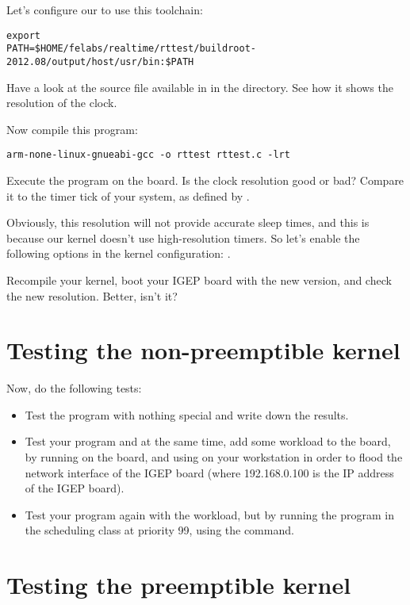Let's configure our  to use this toolchain:

\begin{verbatim}
export
PATH=$HOME/felabs/realtime/rttest/buildroot-2012.08/output/host/usr/bin:$PATH
\end{verbatim}

Have a look at the  source file available in  in
the  directory. See how it shows the resolution of the
 clock.

Now compile this program:
\begin{verbatim}
arm-none-linux-gnueabi-gcc -o rttest rttest.c -lrt
\end{verbatim}

Execute the program on the board. Is the clock resolution good or bad?
Compare it to the timer tick of your system, as defined by .

Obviously, this resolution will not provide accurate sleep times, and
this is because our kernel doesn't use high-resolution timers. So
let's enable the following options in the kernel configuration:
.

Recompile your kernel, boot your IGEP board with the new version, and
check the new resolution. Better, isn't it?

\section{Testing the non-preemptible kernel}

Now, do the following tests:
\begin{itemize}
\item Test the program with nothing special and write down the
  results.
\item Test your program and at the same time, add some workload to the
  board, by running  on the
  board, and using  on your
  workstation in order to flood the network interface of the IGEP
  board (where 192.168.0.100 is the IP address of the IGEP board).
\item Test your program again with the workload, but by running the
  program in the  scheduling class at priority 99,
  using the  command.
\end{itemize}

\section{Testing the preemptible kernel}

